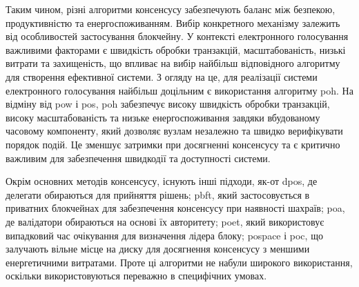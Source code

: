 \documentclass[14pt]{extreport}
\begin{document}
  \begin{table}[H]
  \caption{\\\centering\textbf{Порівняння алгоритмів консенсусу}}
  \label{tab:consensus_comparison}
  \end{table}
  
  Таким чином, різні алгоритми консенсусу забезпечують баланс між безпекою, продуктивністю та енергоспоживанням. Вибір конкретного механізму залежить від особливостей застосування блокчейну. У контексті електронного голосування важливими факторами є швидкість обробки транзакцій, масштабованість, низькі витрати та захищеність, що впливає на вибір найбільш відповідного алгоритму для створення ефективної системи. З огляду на це, для реалізації системи електронного голосування найбільш доцільним є використання алгоритму \gls{poh}. На відміну від \gls{pow} і \gls{pos}, \gls{poh} забезпечує високу швидкість обробки транзакцій, високу масштабованість та низьке енергоспоживання завдяки вбудованому часовому компоненту, який дозволяє вузлам незалежно та швидко верифікувати порядок подій. Це зменшує затримки при досягненні консенсусу та є критично важливим для забезпечення швидкодії та доступності системи.
  
  Окрім основних методів консенсусу, існують інші підходи, як-от \gls{dpos}, де делегати обираються для прийняття рішень; \gls{pbft}, який застосовується в приватних блокчейнах для забезпечення консенсусу при наявності шахраїв; \gls{poa}, де валідатори обираються на основі їх авторитету; \gls{poet}, який використовує випадковий час очікування для визначення лідера блоку; \gls{pospace} і \gls{poc}, що залучають вільне місце на диску для досягнення консенсусу з меншими енергетичними витратами. Проте ці алгоритми не набули широкого використання, оскільки використовуються переважно в специфічних умовах.
  
\end{document}
